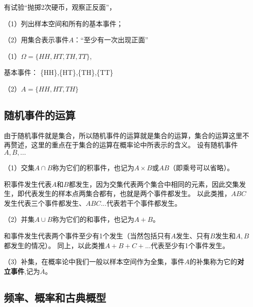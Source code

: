 \begin{example}
    有试验“抛掷2次硬币，观察正反面”，
    
    （1）列出样本空间和所有的基本事件；
    
    （2）用集合表示事件$A$：“至少有一次出现正面”
\end{example}

\begin{solution}
    （1）$\Omega=\{HH,HT,TH,TT\}$,

    基本事件：
    \{HH\},\{HT\},\{TH\},\{TT\}

    （2）$A=\{HH,HT,TH\}$
\end{solution}

\subsection{随机事件的运算}
由于随机事件就是集合，所以随机事件的运算就是集合的运算，集合的运算这里不再赘述，这里的重点在于集合的运算在概率论中所表示的含义。
设有随机事件$A,B,...$

（1）交集$A \cap B$称为它们的积事件，也记为$A \times B$或$AB$（即乘号可以省略）。

积事件发生代表$A$和$B$都发生，因为交集代表两个集合中相同的元素，因此交集发生，即代表发生的样本点两集合都有，也就是两个事件都发生。
以此类推，$ABC$发生代表三个事件都发生、$ABC...$代表若干个事件都发生。

（2）并集$A \cup B$称为它们的和事件，也记为$A+B$。

和事件发生代表两个事件至少有1个发生（当然包括只有$A$发生、只有$B$发生和$A,B$都发生的情况）。
同上，以此类推$A+B+C+...$代表至少有1个事件发生。

（3）补集，在概率论中我们一般以样本空间作为全集，事件$A$的补集称为它的\textbf{对立事件},记为$\overline{A}$。

\subsection{频率、概率和古典概型}